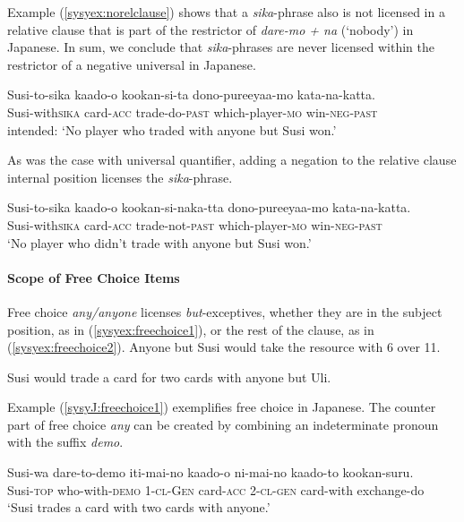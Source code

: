\documentclass[output=paper,colorlinks,citecolor=brown,
]{langscibook}
\def\refp#1{(\ref{sy#1})}
\def\M#1{\textsc{#1}}
\begin{document}
Example \refp{syex:norelclause} shows that a \emph{sika}-phrase also is not licensed in a relative clause that is part of the restrictor of \emph{dare-mo + na} (`nobody') in Japanese.  In sum, we conclude that \emph{sika}-phrases are never licensed within the restrictor of a negative universal in Japanese.

\ea \label{syex:norelclause}
\gll *Susi-to-sika kaado-o kookan-si-ta dono-pureeyaa-mo kata-na-katta.\\
Susi-with\M{sika} card-\M{acc} trade-do-\M{past} which-player-\M{mo} win-\M{neg}-\M{past}\\
\glt intended: `No player who traded with anyone but Susi won.'
\z

As was the case with universal quantifier, adding a negation to the relative clause internal position licenses the \emph{sika}-phrase.

\ea 
\gll Susi-to-sika kaado-o kookan-si-naka-tta dono-pureeyaa-mo kata-na-katta.\\
Susi-with\M{sika} card-\M{acc} trade-not-\M{past} which-player-\M{mo} win-\M{neg}-\M{past}\\
\glt `No player who didn't trade with anyone but Susi won.'
\z


%
        
\paragraph{Scope of Free Choice Items}
Free choice \emph{any/anyone} licenses \emph{but}-exceptives, whether they are in the subject position, as in \refp{syex:freechoice1}, or the rest of the clause, as in \refp{syex:freechoice2}. 
\ea \label{syex:freechoice1}
Anyone but Susi would take the resource with 6 over 11.\z

\ea \label{syex:freechoice2}
Susi would trade a card for two cards with anyone but Uli.\z

Example  \refp{syJ:freechoice1} exemplifies free choice in Japanese. The counter part of free choice \emph{any} can be created by combining an indeterminate pronoun with the suffix \emph{demo}. 

\ea \label{syJ:freechoice1}
\gll Susi-wa dare-to-demo iti-mai-no kaado-o ni-mai-no kaado-to kookan-suru.\\
Susi-\M{top} who-with-\M{demo} 1-\M{cl}-\M{Gen} card-\M{acc} 2-\M{cl}-\M{gen} card-with exchange-do\\
\glt `Susi trades a card with two cards with anyone.'\z
\end{document}
